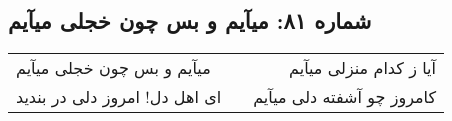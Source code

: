 \begin{center}
\section*{شماره ۸۱: میآیم و بس چون خجلی میآیم}
\label{sec:081}
\begin{longtable}{l p{0.5cm} r}
میآیم و بس چون خجلی میآیم
&&
آیا ز کدام منزلی میآیم
\\
ای اهل دل! امروز دلی در بندید
&&
کامروز چو آشفته دلی میآیم
\\
\end{longtable}
\end{center}
